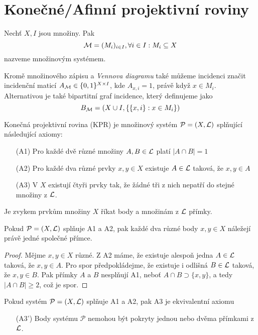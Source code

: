 \section{\texorpdfstring{Konečné/Afinní projektivní roviny}{Konečné/Afinní projektivní roviny}}
\vspace{5mm}
\large

\begin{definition}
    Nechť $X, I$ jsou množiny. Pak
    \[ \operatorname{\mathcal{M}}=(M_i)_{i\in I}, \forall i\in I: M_i\subseteq X \]
    nazveme množinovým systémem.

    Kromě množinového zápisu a \emph{Vennova diagramu} také můžeme incidenci značit incidenční maticí $A_{\operatorname{\mathcal{M}}}\in\{0,1\}^{X\times I}$, kde $A_{x,i}=1$, právě když $x\in M_i$.
    Alternativou je také bipartitní graf incidence, který definujeme jako
    \[B_{\operatorname{\mathcal{M}}}=(X\cup I, \{\{x,i\}: x\in M_i\}) \]
\end{definition}
\begin{definition}\label{kpr_a}
    Konečná projektivní rovina (KPR) je množinový systém $\mathcal{P}=(X,\operatorname{\mathcal{L}})$ splňující následující axiomy:
    \begin{itemize}
        \item[(A1)] Pro každé dvě různé množiny $A,B\in\operatorname{\mathcal{L}}$ platí $|A\cap B|=1$
        \item[(A2)] Pro každé dva různé prvky $x,y\in X$ existuje $A\in\operatorname{\mathcal{L}}$ taková, že $x,y\in A$
        \item[(A3)] V $X$ existují čtyři prvky tak, že žádné tři z nich nepatří do stejné množiny z $\operatorname{\mathcal{L}}$.
    \end{itemize}

    Je zvykem prvkům množiny $X$ říkat body a množinám z $\operatorname{\mathcal{L}}$ přímky.
\end{definition}
\begin{note}
    Pokud $\mathcal{P}=(X,\operatorname{\mathcal{L}})$ splňuje A1 a A2, pak každé dva různé body $x,y\in X$ náležejí právě jedné společné přímce.
\end{note}
\begin{proof}
    Mějme $x,y\in X$ různé.
    Z A2 máme, že existuje alespoň jedna $A\in\operatorname{\mathcal{L}}$ taková, že $x,y\in A$.
    Pro spor předpokládejme, že existuje i odlišná $B\in\operatorname{\mathcal{L}}$ taková, že $x,y\in B$.
    Pak přímky $A$ a $B$ nesplňují A1, neboť $A\cap B\supset \{x,y\}$, a tedy $|A\cap B|\geq 2$, což je spor.
\end{proof}
\begin{note}
    Pokud systém $\mathcal{P}=(X,\operatorname{\mathcal{L}})$ splňuje A1 a A2, pak A3 je ekvivalentní axiomu
    \begin{itemize}
        \item[(A3')] Body systému $\mathcal{P}$ nemohou být pokryty jednou nebo dvěma přímkami z $\operatorname{\mathcal{L}}$.
    \end{itemize}
\end{note}
